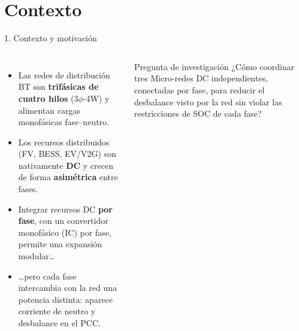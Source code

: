 \documentclass[aspectratio=169,11pt]{beamer}
\begin{document}
\section{Contexto}
\begin{frame}{1. Contexto y motivación}
  \begin{columns}[c]
    \begin{itemize}\setlength\itemsep{4pt}
      \item Las redes de distribución BT son \textbf{trifásicas de cuatro hilos} (3$\phi$-4W) y alimentan cargas monofásicas fase--neutro.
      \item Los recursos distribuidos (FV, BESS, EV/V2G) son nativamente \textbf{DC} y crecen de forma \textbf{asimétrica} entre fases.
      \item Integrar recursos DC \textbf{por fase}, con un convertidor monofásico (IC) por fase, permite una expansión modular\ldots
      \item \ldots pero cada fase intercambia con la red una potencia distinta: aparece \alert{corriente de neutro} y desbalance en el PCC.
    \end{itemize}
    \begin{alertblock}{Pregunta de investigación}
      \small ¿Cómo coordinar tres Micro-redes DC independientes, conectadas por fase, para reducir el desbalance visto por la red sin violar las restricciones de SOC de cada fase?
    \end{alertblock}
  \end{columns}
\end{frame}

\end{document}
